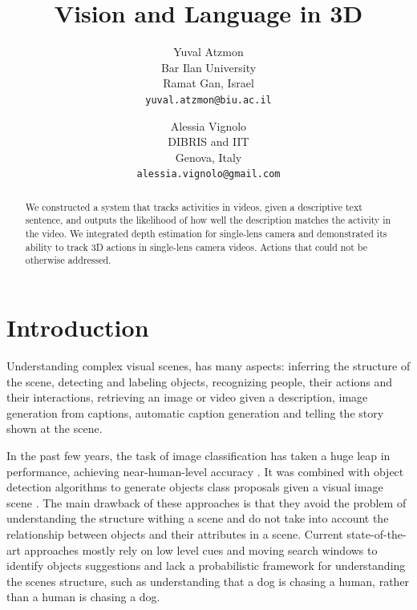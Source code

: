 \documentclass[10pt,twocolumn,letterpaper]{article}
\begin{document}
\title{Vision and Language in 3D}

\author{Yuval Atzmon\\
Bar Ilan University\\
Ramat Gan, Israel\\
{\tt\small yuval.atzmon@biu.ac.il}
\and
Alessia Vignolo\\
DIBRIS and IIT\\
Genova, Italy\\
{\tt\small alessia.vignolo@gmail.com}
}

\maketitle

\begin{abstract}
 We constructed a system that tracks activities in videos, given a descriptive text sentence, and outputs the likelihood of how well the description matches the activity in the video. We integrated depth estimation for single-lens camera and demonstrated its ability to track 3D actions in single-lens camera videos. Actions that could not be otherwise addressed. 
 

\end{abstract}

\section{Introduction}

Understanding complex visual scenes, has many aspects: inferring the structure of the scene, detecting and labeling objects, recognizing people, their actions and their interactions, retrieving an image or video given a description, image generation from captions, automatic caption generation and telling the story shown at the scene.

In the past few years, the task of image classification has taken a huge leap in performance, achieving near-human-level accuracy \cite{imagenetHistory, krizhevsky2012imagenet, googlenet}. It was combined with object detection algorithms to generate objects class proposals given a visual image scene \cite{googlenet, girshick2014rcnn}. The main drawback of these approaches is that they avoid the problem of understanding the structure withing a scene and do not take into account the relationship between objects and their attributes in a scene. Current state-of-the-art approaches mostly rely on low level cues and moving search windows to identify objects suggestions and lack a probabilistic framework for understanding the scenes structure, such as understanding that a dog is chasing a human, rather than a human is chasing a dog.
\end{document}
